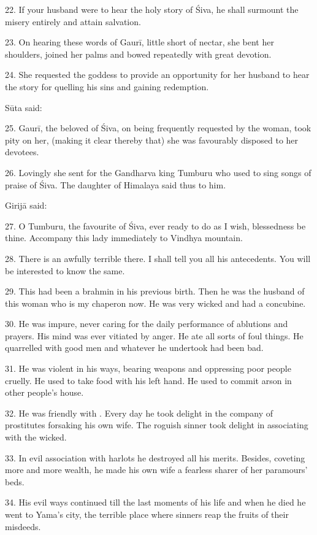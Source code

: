 22. If your husband were to hear the holy story of Śiva, he shall surmount
the misery entirely and attain salvation.

23. On hearing these words of Gaurī, little short of nectar, she bent her
shoulders, joined her palms and bowed repeatedly with great devotion.

24. She requested the goddess to provide an opportunity for her husband to hear
the story for quelling his sins and gaining redemption.

Sūta said:

25. Gaurī, the beloved of Śiva, on being frequently requested by the woman,
took pity on her, (making it clear thereby that) she was favourably disposed to
her devotees.

26. Lovingly she sent for the Gandharva king Tumburu who used to sing songs of
praise of Śiva. The daughter of Himalaya said thus to him.

Girijā said:

27. O Tumburu, the favourite of Śiva, ever ready to do as I wish, blessedness be
thine. Accompany this lady immediately to Vindhya mountain.

28. There is an awfully terrible  there. I shall tell you all his
antecedents. You will be interested to know the same.

29. This  had been a brahmin in his previous birth. Then he was the
husband of this woman who is my chaperon now. He was very wicked and had a
 concubine.

30. He was impure, never caring for the daily performance of ablutions and
 prayers. His mind was ever vitiated by anger. He ate all sorts of
foul things. He quarrelled with good men and whatever he undertook had been bad.

31. He was violent in his ways, bearing weapons and oppressing poor people
cruelly. He used to take food with his left hand. He used to commit arson in
other people’s house.

32. He was friendly with . Every day he took delight in the company
of prostitutes forsaking his own wife. The roguish sinner took delight in
associating with the wicked.

33. In evil association with harlots he destroyed all his merits. Besides,
coveting more and more wealth, he made his own wife a fearless sharer of her
paramours’ beds.

34. His evil ways continued till the last moments of his life and when he died
he went to Yama’s city, the terrible place where sinners reap the fruits of
their misdeeds.

